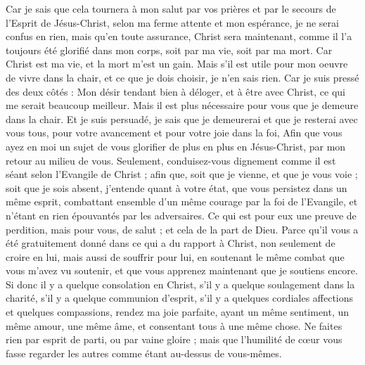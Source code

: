 \begin{multicols}{2}
Car je sais que cela tournera à mon salut par vos prières et par le secours de l'Esprit de Jésus-Christ,
selon ma ferme attente et mon espérance, je ne serai confus en rien, mais qu'en toute assurance, Christ sera maintenant, comme il l'a toujours été glorifié dans mon corps, soit par ma vie, soit par ma mort.
Car Christ est ma vie, et la mort m'est un gain.
Mais s'il est utile pour mon oeuvre de vivre dans la chair, et ce que je dois choisir, je n'en sais rien. 
Car je suis pressé des deux côtés : Mon désir tendant bien à déloger, et à être avec Christ, ce qui me serait beaucoup meilleur. 
Mais il est plus nécessaire pour vous que je demeure dans la chair.
Et je suis persuadé, je sais que je demeurerai et que je resterai avec vous tous, pour votre avancement et pour votre joie dans la foi,
Afin que vous ayez en moi un sujet de vous glorifier de plus en plus en Jésus-Christ, par mon retour au milieu de vous. 
Seulement, conduisez-vous dignement comme il est séant selon l'Evangile de Christ ; afin que, soit que je vienne, et que je vous voie ; soit que je sois absent, j'entende quant à votre état, que vous persistez dans un même esprit, combattant ensemble d'un même courage par la foi de l'Evangile, et n'étant en rien épouvantés par les adversaires.
Ce qui est pour eux une preuve de perdition, mais pour vous, de salut ; et cela de la part de Dieu.
Parce qu'il vous a été gratuitement donné dans ce qui a du rapport à Christ, non seulement de croire en lui, mais aussi de souffrir pour lui,
en soutenant le même combat que vous m'avez vu soutenir, et que vous apprenez maintenant que je soutiens encore.
\VerseOne{}Si donc il y a quelque consolation en Christ, s'il y a quelque soulagement dans la charité, s'il y a quelque communion d'esprit, s'il y a quelques cordiales affections et quelques compassions,
rendez ma joie parfaite, ayant un même sentiment, un même amour, une même âme, et consentant tous à une même chose.
Ne faites rien par esprit de parti, ou par vaine gloire ; mais que l'humilité de cœur vous fasse regarder les autres comme étant au-dessus de vous-mêmes.

\end{multicols}
